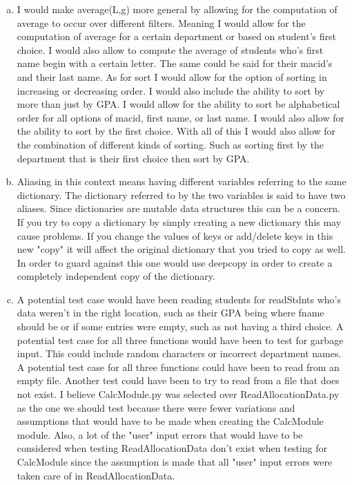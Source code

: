 \documentclass[12pt]{article}
\begin{document}
\begin{enumerate}[(a)]

\item I would make average(L,g) more general by allowing for the computation of average to occur over different filters. Meaning I would allow
for the computation of average for a certain department or based on student's first choice. I would also allow to compute the average of students
who's first name begin with a certain letter. The same could be said for their macid's and their last name. As for sort I would allow for the
option of sorting in increasing or decreasing order. I would also include the ability to sort by more than just by GPA. I would allow for the
ability to sort be alphabetical order for all options of macid, first name, or last name. I would also allow for the ability to sort by the first 
choice. With all of this I would also allow for the combination of different kinds of sorting. Such as sorting first by the department that is 
their first choice then sort by GPA. 

\item Aliasing in this context means having different variables referring to the same dictionary. The dictionary referred to by the two variables
is said to have two aliases. Since dictionaries are mutable data structures this can be a concern. If you try to copy a dictionary by simply
creating a new dictionary this may cause problems. If you change the values of keys or add/delete keys in this new "copy" it will affect the
original dictionary that you tried to copy as well. In order to guard against this one would use deepcopy in order to create a completely 
independent copy of the dictionary. 

\item A potential test case would have been reading students for readStdnts who's data weren't in the right location, such as their GPA being where
fname should be or if some entries were empty, such as not having a third choice. A potential test case for all three functions would have been to 
test for garbage input. This could include random characters or incorrect department names. A potential test case for all three functions could have
been to read from an empty file. Another test could have been to try to read from a file that does not exist. I believe CalcModule.py was selected
over ReadAllocationData.py as the one we should test because there were fewer variations and assumptions that would have to be made when 
creating the CalcModule module. Also, a lot of the "user" input errors that would have to be considered when testing ReadAllocationData don't exist when 
testing for CalcModule since the assumption is made that all "user" input errors were taken care of in ReadAllocationData.


\end{enumerate}
\end{document}
